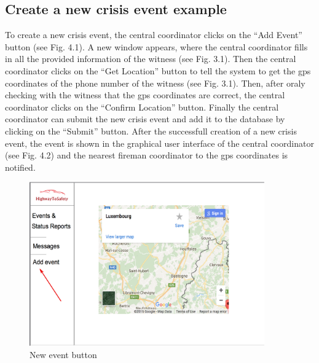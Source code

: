  
\subsection{Create a new crisis event example}
To create a new crisis event, the central coordinator clicks on the “Add Event”
button (see Fig. 4.1). A new window appears, where the central coordinator fills
in all the provided information of the witness (see Fig. 3.1). Then the central
coordinator clicks on the “Get Location” button to tell the system to get the gps coordinates of the phone
number of the witness (see Fig. 3.1). Then, after oraly checking with the
witness that the gps coordinates are correct, the central coordinator clicks on
the “Confirm Location” button.
Finally the central coordinator can submit the new crisis event and add it to
the database by clicking on the “Submit” button. After the successfull creation
of a new crisis event, the event is shown in the graphical user interface of the
central coordinator (see Fig. 4.2) and the nearest fireman coordinator to the
gps coordinates is notified.
\begin{minipage}{1.0\textwidth}
\begin{figure}[H]
\caption{New event button}
\includegraphics[width=0.9\textwidth]{Add_event.eps}
\end{figure}
\end{minipage}

